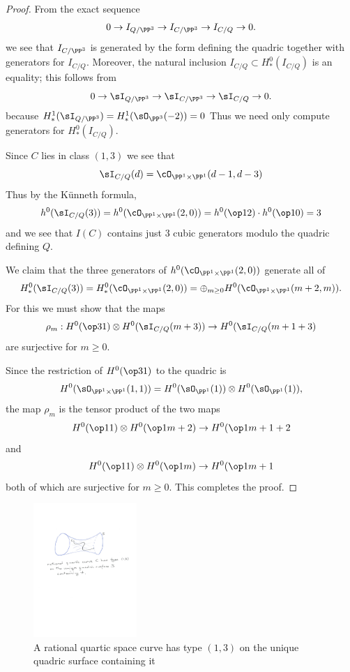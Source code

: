 \begin{proof}
From the exact sequence
$$
0\to I_{Q/\PP^3} \to I_{C/\PP^3} \to I_{C/Q} \to 0.
$$
we see that $I_{C/\PP^3}$ is generated by the form defining the quadric 
together with generators for $I_{C/Q}$. Moreover, 
the natural inclusion $I_{C/Q}\subset H^{0}_{*}(I_{C/Q})$ is an equality; this follows from
$$
0\to \sI_{Q/\PP^3} \to \sI_{C/\PP^3} \to \sI_{C/Q} \to 0.
$$
because $H^{1}_{*}(\sI_{Q/\PP^3}) = H^{1}_{*}(\sO_{\PP^3}(-2)) = 0$
Thus we need only compute generators for $H^{0}_{*}(I_{C/Q})$.

Since $C$ lies in class $(1,3)$ we see that 
$$
\sI_{C/Q}(d) = \cO_{\PP^1\times \PP^1}(d-1, d-3)
%
$$
Thus by the K\"unneth formula,
$$
h^0(\sI_{C/Q}(3)) = h^0(\cO_{\PP^1\times \PP^1}(2, 0)) = h^0(\op12)\cdot h^0(\op10) = 3
$$
and we see that $I(C)$ contains just 3 cubic generators modulo the quadric defining $Q$. 

We claim that the three generators of $h^0(\cO_{\PP^1\times \PP^1}(2, 0))$ generate all of
$$
H^0_{*}(\sI_{C/Q}(3)) = H^0_{*}(\cO_{\PP^1\times \PP^1}(2, 0)) = 
\oplus_{m\geq 0}H^{0}(\cO_{\PP^1\times \PP^1}(m+2,m)).
$$
For this we must show that the maps
$$
\rho_{m}: H^{0}(\op31) \otimes H^0(\sI_{C/Q}(m+3)) \to H^0(\sI_{C/Q}(m+1+3)
$$
are surjective for $m\geq 0$.

Since the restriction
of $H^0(\op31)$ to the quadric is 
$$
H^0(\sO_{\PP^1\times \PP^1}(1,1)) = H^{0}(\sO_{\PP^{1}}(1)) \otimes H^{0}(\sO_{\PP^{1}}(1)),
$$
the map $\rho_{m}$
is the tensor product of the two maps
$$
H^{0}(\op11)\otimes H^{0}(\op1{m+2}) \to H^{0}(\op1{m+1+2}
$$
and 
$$
H^{0}(\op11)\otimes H^{0}(\op1{m}) \to H^{0}(\op1{m+1}
$$
both of which are surjective for $m\geq 0$. This completes the proof.
%
%
\end{proof}

\begin{figure}
 \caption{A rational quartic space curve has type $(1,3)$ on the unique quadric surface containing it}
\centerline {\includegraphics[height=2in]{"Fig3.2.pdf"}}
\end{figure}


